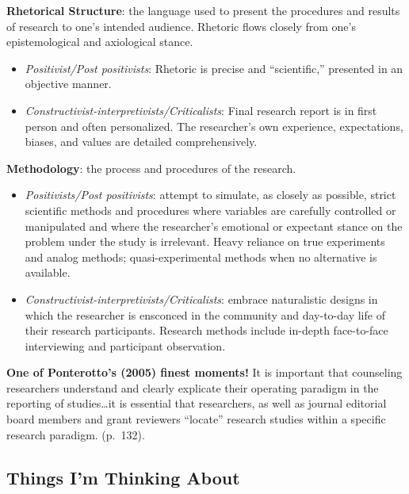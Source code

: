 \documentclass[
  english,
]{book}
\providecommand{\tightlist}{%
  \setlength{\itemsep}{0pt}\setlength{\parskip}{0pt}}
\begin{document}
\textbf{Rhetorical Structure}: the language used to present the procedures and results of research to one's intended audience. Rhetoric flows closely from one's epistemological and axiological stance.

\begin{itemize}
\tightlist
\item
  \emph{Positivist/Post positivists}: Rhetoric is precise and ``scientific,'' presented in an objective manner.
\item
  \emph{Constructivist-interpretivists/Criticalists}: Final research report is in first person and often personalized. The researcher's own experience, expectations, biases, and values are detailed comprehensively.
\end{itemize}

\textbf{Methodology}: the process and procedures of the research.

\begin{itemize}
\tightlist
\item
  \emph{Positivists/Post positivists}: attempt to simulate, as closely as possible, strict scientific methods and procedures where variables are carefully controlled or manipulated and where the researcher's emotional or expectant stance on the problem under the study is irrelevant. Heavy reliance on true experiments and analog methods; quasi-experimental methods when no alternative is available.
\item
  \emph{Constructivist-interpretivists/Criticalists}: embrace naturalistic designs in which the researcher is ensconced in the community and day-to-day life of their research participants. Research methods include in-depth face-to-face interviewing and participant observation.
\end{itemize}

\textbf{One of Ponterotto's (2005) finest moments!}
It is important that counseling researchers understand and clearly explicate their operating paradigm in the reporting of studies\ldots it is essential that researchers, as well as journal editorial board members and grant reviewers ``locate'' research studies within a specific research paradigm. (p.~132).

\hypertarget{things-im-thinking-about}{%
\subsection{Things I'm Thinking About}\label{things-im-thinking-about}}
\end{document}
